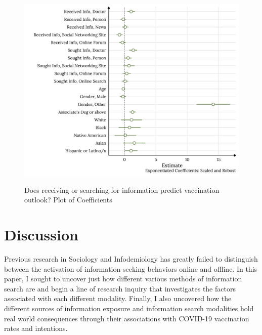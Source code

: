 \begin{figure}[h]
{\centering \includegraphics[width=0.8\linewidth]{figs/paper2/plot-model-3-1}}
\caption{Does receiving or searching for information predict vaccination outlook? Plot of Coefficients}\label{fig:plot-model-3}
\end{figure}

\hypertarget{discussion}{%
\section{Discussion}\label{discussion}}

Previous research in Sociology and Infodemiology has greatly failed to
distinguish between the activation of information-seeking behaviors online and
offline. In this paper, I sought to uncover just how different various methods of
information search are and begin a line of research inquiry that investigates
the factors associated with each different modality. Finally, I also uncovered
how the different sources of information exposure and information search
modalities hold real world consequences through their associations with COVID-19
vaccination rates and intentions.


